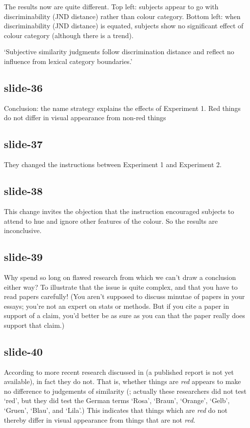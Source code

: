 \documentclass[12pt,\papersize]{extarticle}
\begin{document}
The results now are quite different.
Top left: subjects appear to go with discriminability (JND distance)
rather than colour category.
Bottom left: when discriminability (JND distance) is equated,
subjects show no significant effect of colour category (although there is a trend).

‘Subjective similarity judgments follow
discrimination distance and reflect no influence from lexical category
boundaries.’ \citep[p.~73]{kay_what_1984}

\subsection{slide-36}
Conclusion: the name strategy explains the effects of Experiment 1.
Red things do not differ in visual appearance from non-red things

\subsection{slide-37}
They changed the instructions between Experiment 1 and Experiment 2.

\subsection{slide-38}
This change invites the objection that the instruction
encouraged
subjects to attend to hue and ignore other features of the colour.
So the results are inconclusive.

\subsection{slide-39}
Why spend so long on flawed research from which we can’t draw a conclusion
either way?  To illustrate that the issue is quite complex,
and that you have to read papers carefully!
(You aren’t supposed to discuss minutae of papers in your essays;
you’re not an expert on stats or methods.  But if you cite a paper
in support of a claim, you’d better be as sure as you can that the
paper really does support that claim.)

\subsection{slide-40}
According to more recent research discussed in \citep{witzel2014category}
(a published report is not yet available), in fact they do not. That is,
whether things are \emph{red} appears to make no difference to judgements
of similarity (\citealp{witzel2014category}; actually these researchers did
not test ‘red’, but they did test the German terms ‘Rosa’, ‘Braun’,
‘Orange’, ‘Gelb’, ‘Gruen’, ‘Blau’, and ‘Lila’.) This indicates that things
which are \emph{red} do not thereby differ in visual appearance from things
that are not \emph{red}.
\end{document}
